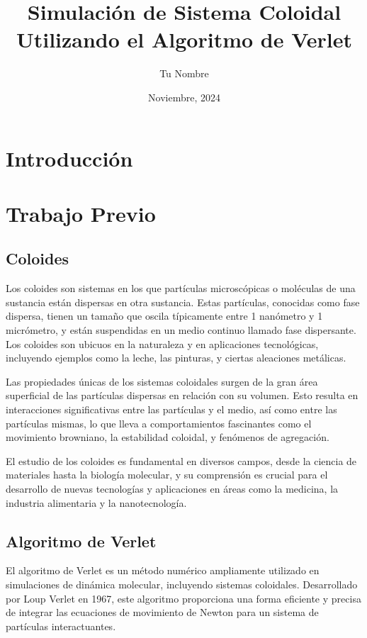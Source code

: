 \documentclass[twocolumn]{article}
\title{Simulación de Sistema Coloidal Utilizando el Algoritmo de Verlet}
\author{Tu Nombre}
\date{Noviembre, 2024}
\begin{document}
\maketitle

\begin{abstract}
\end{abstract}

\section{Introducción}

\section{Trabajo Previo}
\subsection*{Coloides}
Los coloides son sistemas en los que partículas microscópicas o moléculas de una sustancia están dispersas en otra sustancia. Estas partículas, conocidas como fase dispersa, tienen un tamaño que oscila típicamente entre 1 nanómetro y 1 micrómetro, y están suspendidas en un medio continuo llamado fase dispersante. Los coloides son ubicuos en la naturaleza y en aplicaciones tecnológicas, incluyendo ejemplos como la leche, las pinturas, y ciertas aleaciones metálicas.

Las propiedades únicas de los sistemas coloidales surgen de la gran área superficial de las partículas dispersas en relación con su volumen. Esto resulta en interacciones significativas entre las partículas y el medio, así como entre las partículas mismas, lo que lleva a comportamientos fascinantes como el movimiento browniano, la estabilidad coloidal, y fenómenos de agregación.

El estudio de los coloides es fundamental en diversos campos, desde la ciencia de materiales hasta la biología molecular, y su comprensión es crucial para el desarrollo de nuevas tecnologías y aplicaciones en áreas como la medicina, la industria alimentaria y la nanotecnología.

\subsection*{Algoritmo de Verlet}
El algoritmo de Verlet es un método numérico ampliamente utilizado en simulaciones de dinámica molecular, incluyendo sistemas coloidales. Desarrollado por Loup Verlet en 1967, este algoritmo proporciona una forma eficiente y precisa de integrar las ecuaciones de movimiento de Newton para un sistema de partículas interactuantes.
\end{document}
